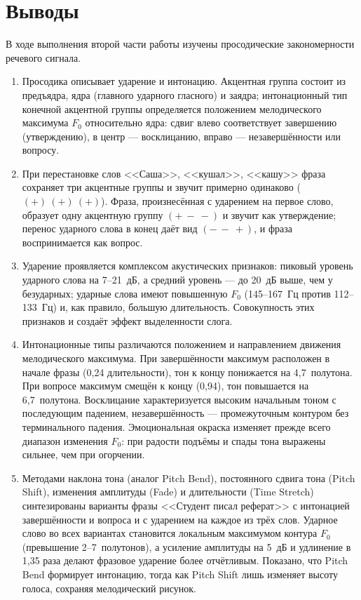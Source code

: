 \section{Выводы}

В ходе выполнения второй части работы изучены просодические
закономерности речевого сигнала.

\begin{enumerate}
	\item Просодика описывает ударение и интонацию. Акцентная группа
	состоит из предъядра, ядра (главного ударного гласного) и заядра;
	интонационный тип конечной акцентной группы определяется положением
	мелодического максимума $F_0$ относительно ядра: сдвиг влево
	соответствует завершению (утверждению), в центр --- восклицанию,
	вправо --- незавершённости или вопросу.

	\item При перестановке слов <<Саша>>, <<кушал>>, <<кашу>> фраза
	сохраняет три акцентные группы и звучит примерно одинаково
	($(+)\ (+)\ (+)$). Фраза, произнесённая с ударением на первое слово,
	образует одну акцентную группу $(+\ -\ -)$ и звучит как утверждение;
	перенос ударного слова в конец даёт вид $(-\ -\ +)$, и фраза
	воспринимается как вопрос.

	\item Ударение проявляется комплексом акустических признаков:
	пиковый уровень ударного слова на 7--21~дБ, а средний уровень --- до
	20~дБ выше, чем у безударных; ударные слова имеют повышенную
	$F_0$ (145--167~Гц против 112--133~Гц) и, как правило, большую
	длительность. Совокупность этих признаков и создаёт эффект
	выделенности слога.

	\item Интонационные типы различаются положением и направлением
	движения мелодического максимума. При завершённости максимум
	расположен в начале фразы (0,24 длительности), тон к концу понижается
	на 4,7~полутона. При вопросе максимум смещён к концу (0,94), тон
	повышается на 6,7~полутона. Восклицание характеризуется высоким
	начальным тоном с последующим падением, незавершённость ---
	промежуточным контуром без терминального падения. Эмоциональная
	окраска изменяет прежде всего диапазон изменения $F_0$: при радости
	подъёмы и спады тона выражены сильнее, чем при огорчении.

	\item Методами наклона тона (аналог Pitch Bend), постоянного сдвига
	тона (Pitch Shift), изменения амплитуды (Fade) и длительности
	(Time Stretch) синтезированы варианты фразы <<Студент писал
	реферат>> с интонацией завершённости и вопроса и с ударением на
	каждое из трёх слов. Ударное слово во всех вариантах становится
	локальным максимумом контура $F_0$ (превышение 2--7~полутонов),
	а усиление амплитуды на 5~дБ и удлинение в 1,35 раза делают
	фразовое ударение более отчётливым. Показано, что Pitch Bend
	формирует интонацию, тогда как Pitch Shift лишь изменяет высоту
	голоса, сохраняя мелодический рисунок.


\end{enumerate}
